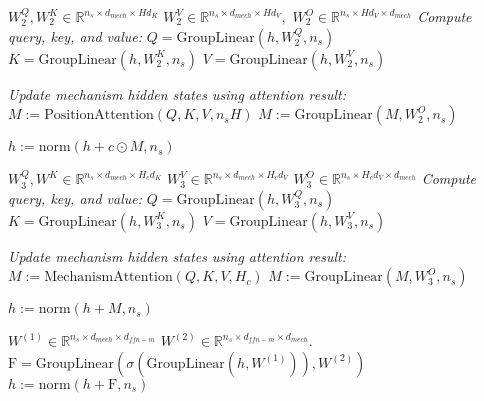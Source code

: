 \documentclass{article}
\begin{document}
\begin{algorithm}[h]
\begin{algorithmic}
   \item[]
   
   \STATE \quad $W_2^Q, W_2^K \in \mathbb{R}^{n_s \times d_\mathit{mech} \times H d_K}$
   \STATE \quad $W_2^V\in \mathbb{R}^{n_s \times d_\mathit{mech} \times H d_V},$
   \STATE \quad $W_2^O\in \mathbb{R}^{n_s \times Hd_V \times d_\mathit{mech}}$  
   \STATE \textit{Compute query, key, and value:}
   \STATE \quad $Q = \mathrm{GroupLinear}(h, W_2^Q, n_s)$ 
   \STATE \quad $K = \mathrm{GroupLinear}(h, W_2^K, n_s)$
   \STATE \quad $V = \mathrm{GroupLinear}(h, W_2^V, n_s)$
   
     \STATE \textit{Update mechanism hidden states using attention result:}
   \STATE \quad $M := \mathrm{PositionAttention}(Q, K, V, n_s H)$
   \STATE \quad $M := \mathrm{GroupLinear}(M, W_2^O, n_s)$

   \STATE \quad $h := \mathrm{norm}(h + c \odot M, n_s)$

   \item[]
   


   \STATE \quad $W_3^Q,W^K\in \mathbb{R}^{n_s \times d_\mathit{mech} \times H_c d_K}$
   \STATE \quad $W_3^V\in \mathbb{R}^{n_s \times d_\mathit{mech} \times H_c d_V}$
   \STATE \quad $W_3^O\in \mathbb{R}^{n_s \times H_c d_V \times d_\mathit{mech}}$
   \STATE \textit{Compute query, key, and value:}
   \STATE \quad $Q = \mathrm{GroupLinear}(h, W_3^Q, n_s)$
   \STATE \quad $K = \mathrm{GroupLinear}(h, W_3^K, n_s)$
   \STATE \quad $V = \mathrm{GroupLinear}(h, W_3^V, n_s)$
   
 
   \STATE \textit{Update mechanism hidden states using attention result:}
   \STATE \quad $M := \mathrm{MechanismAttention}(Q, K, V, H_c)$
   \STATE \quad $M := \mathrm{GroupLinear}(M, W_3^O, n_s)$

   \STATE \quad $h := \mathrm{norm}(h + M, n_s)$

   \item[]
   \STATE \quad $W^{(1)}\in \mathbb{R}^{n_s \times d_\mathit{mech} \times d_\mathit{ffn-m}}$
   \STATE \quad $W^{(2)}\in \mathbb{R}^{n_s \times d_\mathit{ffn-m} \times d_\mathit{mech}}$.  
   \STATE \quad ${\text{F} = \mathrm{GroupLinear}(\sigma(\mathrm{GroupLinear}(h,W^{(1)})),W^{(2)})}$
   \STATE \quad $h := \text{norm}(h + \text{F}, n_s)$
\end{algorithmic}


\end{algorithm}
\end{document}
